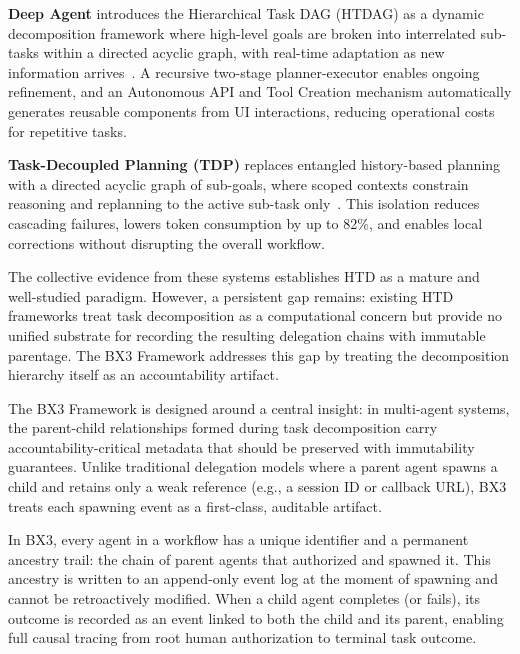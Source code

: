 \textbf{Deep Agent} introduces the Hierarchical Task DAG (HTDAG) as a dynamic decomposition framework where high-level goals are broken into interrelated sub-tasks within a directed acyclic graph, with real-time adaptation as new information arrives~\cite{arxiv:2502.07056}. A recursive two-stage planner-executor enables ongoing refinement, and an Autonomous API and Tool Creation mechanism automatically generates reusable components from UI interactions, reducing operational costs for repetitive tasks.

\textbf{Task-Decoupled Planning (TDP)} replaces entangled history-based planning with a directed acyclic graph of sub-goals, where scoped contexts constrain reasoning and replanning to the active sub-task only~\cite{arxiv:2601.07577}. This isolation reduces cascading failures, lowers token consumption by up to 82\%, and enables local corrections without disrupting the overall workflow.

The collective evidence from these systems establishes HTD as a mature and well-studied paradigm. However, a persistent gap remains: existing HTD frameworks treat task decomposition as a computational concern but provide no unified substrate for recording the resulting delegation chains with immutable parentage. The BX3 Framework addresses this gap by treating the decomposition hierarchy itself as an accountability artifact.


The BX3 Framework is designed around a central insight: in multi-agent systems, the parent-child relationships formed during task decomposition carry accountability-critical metadata that should be preserved with immutability guarantees. Unlike traditional delegation models where a parent agent spawns a child and retains only a weak reference (e.g., a session ID or callback URL), BX3 treats each spawning event as a first-class, auditable artifact.

In BX3, every agent in a workflow has a unique identifier and a permanent ancestry trail: the chain of parent agents that authorized and spawned it. This ancestry is written to an append-only event log at the moment of spawning and cannot be retroactively modified. When a child agent completes (or fails), its outcome is recorded as an event linked to both the child and its parent, enabling full causal tracing from root human authorization to terminal task outcome.

